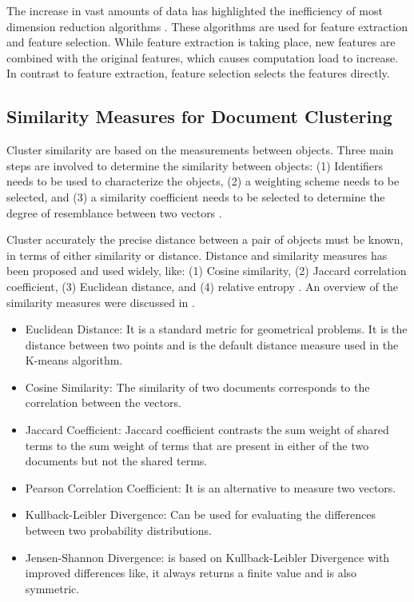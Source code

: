 The increase in vast amounts of data has highlighted the inefficiency of most dimension reduction algorithms \cite{mugunthadevi2011survey}. These algorithms are used for feature extraction and feature selection. While feature extraction is taking place, new features are combined with the original features, which causes computation load to increase. In contrast to feature extraction,  feature selection selects the features directly.

\subsection{Similarity Measures for Document Clustering} \label{JSD}

Cluster similarity are based on the measurements between objects. Three main steps are involved to determine the similarity between objects: (1) Identifiers needs to be used to characterize the objects, (2) a weighting scheme needs to be selected, and (3) a similarity coefficient needs to be selected to determine the degree of resemblance between two vectors \cite{willett1988recent}. 

Cluster accurately the precise distance between a pair of objects must be known, in terms of either similarity or distance. Distance and similarity measures has been proposed and used widely, like: (1) Cosine similarity, (2) Jaccard correlation coefficient, (3) Euclidean distance, and (4) relative entropy \cite{huang2008similarity}. An overview of the similarity measures were discussed in \cite{huang2008similarity}.
\begin{itemize}
    \item Euclidean Distance: It is a standard metric for geometrical problems. It is the distance between two points and is the default distance measure used in the K-means algorithm.
    \item Cosine Similarity: The similarity of two documents corresponds to the correlation between the vectors.
    \item Jaccard Coefficient: Jaccard coefficient contrasts the sum weight of shared terms to the sum weight of terms that are present in either of the two documents but not the shared terms.
    \item Pearson Correlation Coefficient: It is an alternative to measure two vectors.
    \item Kullback-Leibler Divergence: Can be used for evaluating the differences between two probability distributions.
    \item Jensen-Shannon Divergence: is based on Kullback-Leibler Divergence with improved differences like, it always returns a finite value and is also symmetric. 
\end{itemize}

